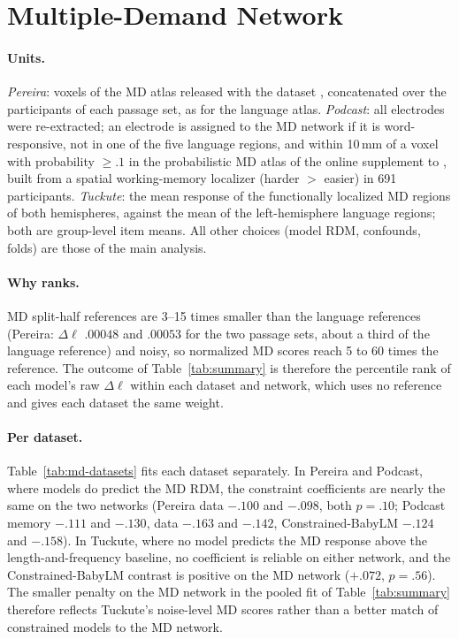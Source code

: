 \section{Multiple-Demand Network}
\label{app:md}

\paragraph{Units.} \emph{Pereira}: voxels of the MD atlas released with the dataset \citep{pereira2018toward}, concatenated over the participants of each passage set, as for the language atlas. \emph{Podcast}: all electrodes were re-extracted; an electrode is assigned to the MD network if it is word-responsive, not in one of the five language regions, and within 10\,mm of a voxel with probability $\geq.1$ in the probabilistic MD atlas of the online supplement to \citet{lipkin2022probabilistic} \citep{lipkin2023mdtom}, built from a spatial working-memory localizer (harder $>$ easier) in 691 participants. \emph{Tuckute}: the mean response of the functionally localized MD regions of both hemispheres, against the mean of the left-hemisphere language regions; both are group-level item means. All other choices (model RDM, confounds, folds) are those of the main analysis.

\paragraph{Why ranks.} MD split-half references are 3--15 times smaller than the language references (Pereira: $\Delta\ell$ $.00048$ and $.00053$ for the two passage sets, about a third of the language reference) and noisy, so normalized MD scores reach 5 to 60 times the reference. The outcome of Table~\ref{tab:summary} is therefore the percentile rank of each model's raw $\Delta\ell$ within each dataset and network, which uses no reference and gives each dataset the same weight.



\paragraph{Per dataset.} Table~\ref{tab:md-datasets} fits each dataset separately. In Pereira and Podcast, where models do predict the MD RDM, the constraint coefficients are nearly the same on the two networks (Pereira data $-.100$ and $-.098$, both $p=.10$; Podcast memory $-.111$ and $-.130$, data $-.163$ and $-.142$, Constrained-BabyLM $-.124$ and $-.158$). In Tuckute, where no model predicts the MD response above the length-and-frequency baseline, no coefficient is reliable on either network, and the Constrained-BabyLM contrast is positive on the MD network ($+.072$, $p=.56$). The smaller penalty on the MD network in the pooled fit of Table~\ref{tab:summary} therefore reflects Tuckute's noise-level MD scores rather than a better match of constrained models to the MD network.
